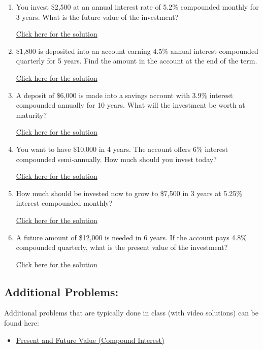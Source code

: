 \documentclass[
]{book}
\providecommand{\tightlist}{%
  \setlength{\itemsep}{0pt}\setlength{\parskip}{0pt}}
\begin{document}
\begin{enumerate}
\def\labelenumi{\arabic{enumi}.}
\tightlist
\item
  You invest \$2,500 at an annual interest rate of 5.2\% compounded monthly for 3 years. What is the future value of the investment?

  \href{https://youtu.be/5w9hc7thqwE}{Click here for the solution}
\item
  \$1,800 is deposited into an account earning 4.5\% annual interest compounded quarterly for 5 years. Find the amount in the account at the end of the term.

  \href{https://youtu.be/tLfjhf_mshg}{Click here for the solution}
\item
  A deposit of \$6,000 is made into a savings account with 3.9\% interest compounded annually for 10 years. What will the investment be worth at maturity?

  \href{https://youtu.be/9CMaL7HUPEs}{Click here for the solution}
\item
  You want to have \$10,000 in 4 years. The account offers 6\% interest compounded semi-annually. How much should you invest today?

  \href{https://youtu.be/p5kNaZKyv7g}{Click here for the solution}
\item
  How much should be invested now to grow to \$7,500 in 3 years at 5.25\% interest compounded monthly?

  \href{https://youtu.be/d2MkmbyQmG8}{Click here for the solution}
\item
  A future amount of \$12,000 is needed in 6 years. If the account pays 4.8\% compounded quarterly, what is the present value of the investment?

  \href{https://youtu.be/MmyATTVMOK4}{Click here for the solution}
\end{enumerate}

\subsection*{Additional Problems:}\label{additional-problems-9}

Additional problems that are typically done in class (with video solutions) can be found here:

\begin{itemize}
\tightlist
\item
  \href{https://theelementsmath.github.io/M114/compound-interest.html\#present-and-future-values}{Present and Future Value (Compound Interest)}
\end{itemize}
\end{document}
